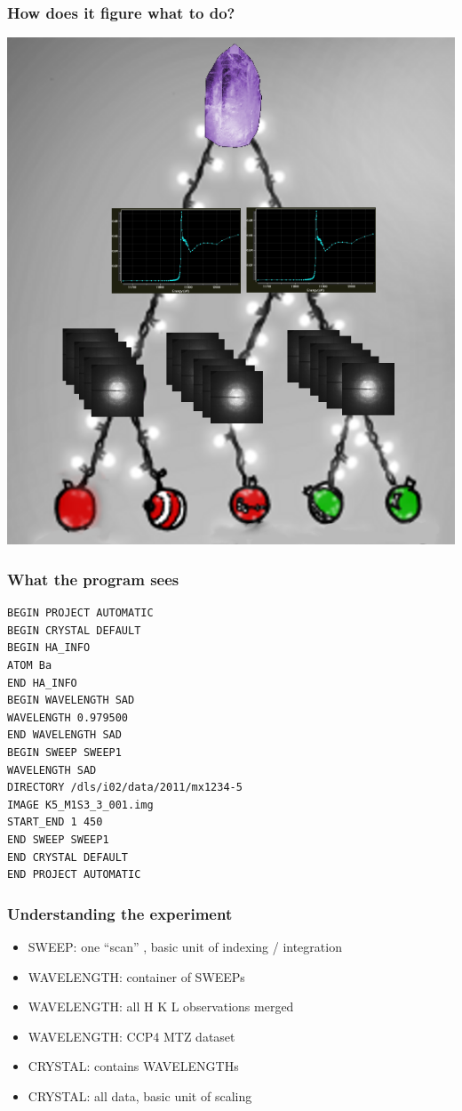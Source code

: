 \documentclass[slides,compress]{beamer}
\begin{document}
\begin{frame}
\frametitle{How does it figure what to do?}
\hspace{4cm}
\includegraphics[scale=0.25]{figures/christmas-tree-nothing-sweep.png}
\end{frame}

\begin{frame}[fragile]
\frametitle{What the program sees}
{\small
\begin{verbatim}
BEGIN PROJECT AUTOMATIC
BEGIN CRYSTAL DEFAULT
BEGIN HA_INFO
ATOM Ba
END HA_INFO
BEGIN WAVELENGTH SAD
WAVELENGTH 0.979500
END WAVELENGTH SAD
BEGIN SWEEP SWEEP1
WAVELENGTH SAD
DIRECTORY /dls/i02/data/2011/mx1234-5
IMAGE K5_M1S3_3_001.img
START_END 1 450
END SWEEP SWEEP1
END CRYSTAL DEFAULT
END PROJECT AUTOMATIC
\end{verbatim}
}
\end{frame}

\begin{frame}
\frametitle{Understanding the experiment}
\begin{itemize}
\item{SWEEP: one ``scan'' , basic unit of indexing / integration}
\item{WAVELENGTH: container of SWEEPs}
\item{WAVELENGTH: all H K L observations merged}
\item{WAVELENGTH: CCP4 MTZ dataset}
\item{CRYSTAL: contains WAVELENGTHs}
\item{CRYSTAL: all data, basic unit of scaling}
\end{itemize}
\end{frame}
\end{document}
